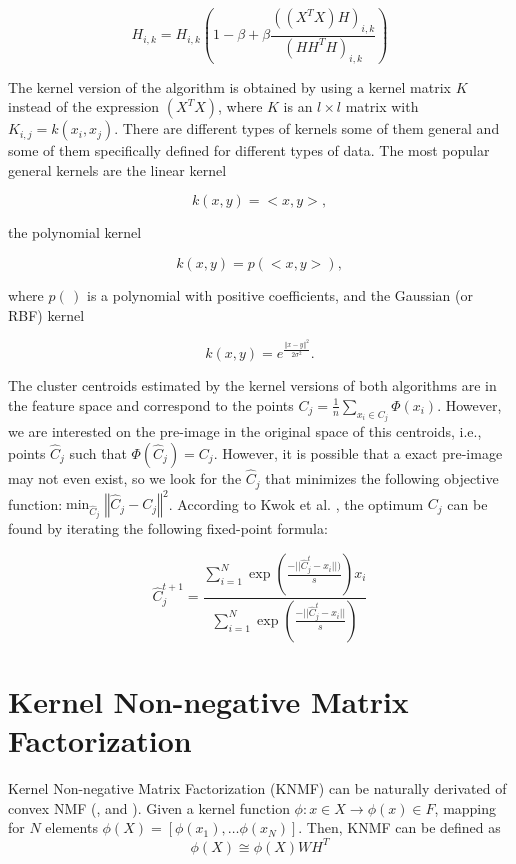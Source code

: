 \documentclass[letterpaper,12pt]{article}
\begin{document}
\[
H_{i,k}=H_{i,k}(1-\beta+\beta\frac{((X^{T}X)H)_{i,k}}{(HH^{T}H)_{i,k}})
\]


The kernel version of the algorithm is obtained by using a kernel matrix $K$ instead of the expression $(X^{T}X)$, where $K$ is an
$l\times l$ matrix with $K_{i,j}=k(x_{i},x_{j}).$ There are different types of kernels some of them general and some of them specifically defined for different types of data. The most popular general kernels are the linear kernel 

\begin{equation}
k(x,y)=<x,y>,\label{eq:id-kernel}
\end{equation}

 the polynomial kernel 
 
\[
k(x,y)=p(<x,y>),
\]

 where $p(\,)$ is a polynomial with positive coefficients, and the Gaussian (or RBF) kernel 
 
\begin{equation}
k(x,y)=e^{\frac{\left\Vert x-y\right\Vert ^{2}}{2\sigma^{2}}}.\label{eq:Gaussian-kernel}
\end{equation}


The cluster centroids estimated by the kernel versions of both algorithms are in the feature space and correspond to the points $C_{j}=\frac{1}{n}\sum_{x_{i}\in C_{j}}\Phi(x_{i})$. However, we are interested on the pre-image in the original space of this centroids, i.e., points $\hat{C}_{j}$ such that $\Phi(\hat{C}_{j})=C_{j}$. However, it is possible that a exact pre-image may not even exist, so we look for the $\hat{C}_{j}$ that minimizes the following objective function:$\min_{\hat{C}_{j}}\left\Vert \hat{C}_{j}-C_{j}\right\Vert ^{2}$. According to Kwok et al. \cite{kwok2004preimage}, the optimum $C_{j}$ can be found by iterating the following fixed-point formula:

\begin{equation}
\hat{C}_{j}^{t+1}=\frac{\sum_{i=1}^{N}\exp(\frac{-||\hat{C}_{j}^{t}-x_{i}||)}{s})x_{i}}{\sum_{i=1}^{N}\exp(\frac{-||\hat{C}_{j}^{t}-x_{i}||}{s})}\label{eq:back-projection}
\end{equation}


\section{Kernel Non-negative Matrix Factorization}

Kernel Non-negative Matrix Factorization (KNMF) can be naturally derivated of convex NMF (\cite{Kulis2006}, \cite{Li2005} and \cite{Rosipal2001}). Given a kernel function $\phi:x\in X \rightarrow \phi(x)\in F $, mapping for $N$ elements $\phi(X) = [ \phi(x_1),\ldots \phi(x_N) ]$. Then, KNMF can be defined as
\begin{equation}
 \phi(X)\cong\phi(X)WH^T
\end{equation}\label{eq:KNMF}
\end{document}
